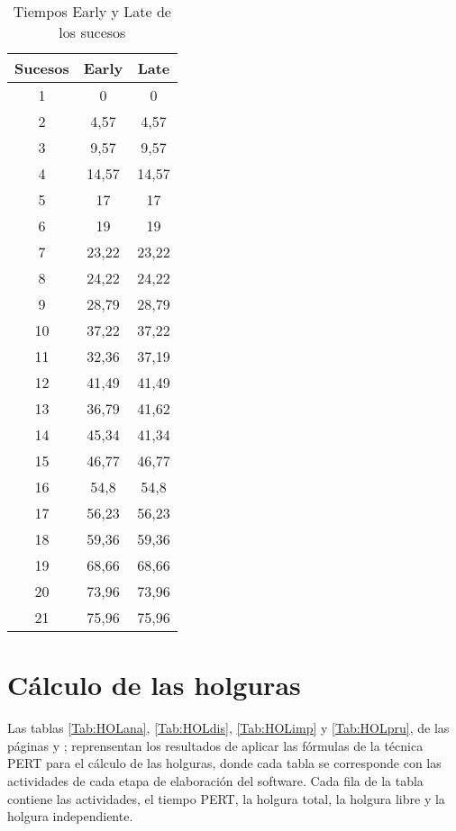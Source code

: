 \documentclass[11pt,a4paper,spanish,twoside]{report}
\begin{document}
\begin{table}[!h]
\centering
  \begin{tabular}{|c|c|c|}
    \hline
    \textbf{Sucesos} & \textbf{Early} & \textbf{Late} \\
    \hline \hline
    1  & 0     & 0     \\
    \hline
    2  & 4,57  & 4,57  \\
    \hline
    3  & 9,57  & 9,57  \\
    \hline
    4  & 14,57 & 14,57 \\
    \hline
    5  & 17    & 17    \\
    \hline
    6  & 19    & 19    \\
    \hline
    7  & 23,22 & 23,22 \\
    \hline
    8  & 24,22 & 24,22 \\
    \hline
    9  & 28,79 & 28,79 \\
    \hline
    10 & 37,22 & 37,22 \\
    \hline
    11 & 32,36 & 37,19 \\
    \hline
    12 & 41,49 & 41,49 \\
    \hline
    13 & 36,79 & 41,62 \\
    \hline
    14 & 45,34 & 41,34 \\
    \hline
    15 & 46,77 & 46,77 \\
    \hline
    16 & 54,8  & 54,8  \\
    \hline
    17 & 56,23 & 56,23 \\
    \hline
    18 & 59,36 & 59,36 \\
    \hline
    19 & 68,66 & 68,66 \\
    \hline
    20 & 73,96 & 73,96 \\
    \hline
    21 & 75,96 & 75,96 \\
    \hline
  \end{tabular}
  \caption{Tiempos Early y Late de los sucesos}
  \label{Tab:tearly}
\end{table}

\section{Cálculo de las holguras}
Las tablas \ref{Tab:HOLana}, \ref{Tab:HOLdis}, \ref{Tab:HOLimp} y
\ref{Tab:HOLpru}, de las páginas \pageref{Tab:HOLana} y \pageref{Tab:HOLpru};
reprensentan los resultados de aplicar las fórmulas de la
técnica PERT para el cálculo de las holguras, donde cada tabla se corresponde
con las actividades de cada etapa de elaboración del software. Cada fila de la
tabla contiene las actividades, el tiempo PERT, la holgura total, la holgura
libre y la holgura independiente.
\end{document}
